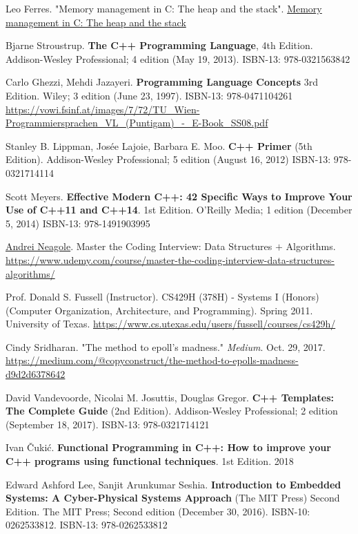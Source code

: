 \documentclass[10pt]{amsart}
\begin{document}
\begin{thebibliography}{9}
Leo Ferres.  "Memory management in C: The heap and the stack".  \href{http://www.inf.udec.cl/~leo/teoX.pdf}{Memory management in C: The heap and the stack}


Bjarne Stroustrup.  \textbf{The C++ Programming Language}, 4th Edition. Addison-Wesley Professional; 4 edition (May 19, 2013).  ISBN-13: 978-0321563842

Carlo Ghezzi, Mehdi Jazayeri.  \textbf{Programming Language Concepts} 3rd Edition.  Wiley; 3 edition (June 23, 1997).  ISBN-13: 978-0471104261  \url{https://vowi.fsinf.at/images/7/72/TU_Wien-Programmiersprachen_VL_(Puntigam)_-_E-Book_SS08.pdf}

Stanley B. Lippman, Jos\'{e}e Lajoie, Barbara E. Moo. \textbf{C++ Primer} (5th Edition).  Addison-Wesley Professional; 5 edition (August 16, 2012) ISBN-13: 978-0321714114 

Scott Meyers.  \textbf{Effective Modern C++: 42 Specific Ways to Improve Your Use of C++11 and C++14}. 1st Edition.  O'Reilly Media; 1 edition (December 5, 2014)  ISBN-13: 978-1491903995

\href{https://www.udemy.com/course/master-the-coding-interview-data-structures-algorithms/#instructor-1}{Andrei Neagole}. Master the Coding Interview: Data Structures $+$ Algorithms. 
\url{https://www.udemy.com/course/master-the-coding-interview-data-structures-algorithms/}

Prof. Donald S. Fussell (Instructor). CS429H (378H) - Systems I (Honors) (Computer Organization, Architecture, and Programming). Spring 2011. University of Texas. \url{https://www.cs.utexas.edu/users/fussell/courses/cs429h/}

 Cindy Sridharan. "The method to epoll's madness." \emph{Medium}. Oct. 29, 2017. \url{https://medium.com/@copyconstruct/the-method-to-epolls-madness-d9d2d6378642}

David Vandevoorde, Nicolai M. Josuttis, Douglas Gregor. \textbf{C++ Templates: The Complete Guide} (2nd Edition). Addison-Wesley Professional; 2 edition (September 18, 2017). ISBN-13: 978-0321714121

Ivan \v{C}uki\'{c}. \textbf{Functional Programming in C++: How to improve your C++ programs using functional techniques}. 1st Edition. 2018


Edward Ashford Lee, Sanjit Arunkumar Seshia. \textbf{Introduction to Embedded Systems: A Cyber-Physical Systems Approach} (The MIT Press) Second Edition. The MIT Press; Second edition (December 30, 2016). ISBN-10: 0262533812. ISBN-13: 978-0262533812



\end{thebibliography}
\end{document}
